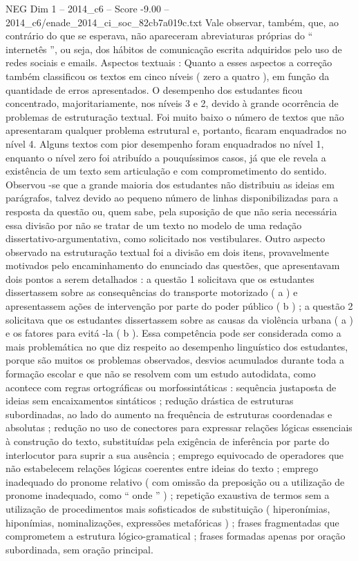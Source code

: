 \begin{textsample}{NEG Dim 1 – 2014\_c6 – Score -9.00 – 2014\_c6/enade\_2014\_ci\_soc\_82cb7a019c.txt}
Vale observar, também, que, ao contrário do que se esperava, não apareceram abreviaturas próprias do “ internetês ”, ou seja, dos hábitos de comunicação escrita adquiridos pelo uso de redes sociais e emails.
Aspectos textuais : Quanto a esses aspectos a correção também classificou os textos em cinco níveis ( zero a quatro ), em função da quantidade de erros apresentados.
O desempenho dos estudantes ficou concentrado, majoritariamente, nos níveis 3 e 2, devido à grande ocorrência de problemas de estruturação textual.
Foi muito baixo o número de textos que não apresentaram qualquer problema estrutural e, portanto, ficaram enquadrados no nível 4.
Alguns textos com pior desempenho foram enquadrados no nível 1, enquanto o nível zero foi atribuído a pouquíssimos casos, já que ele revela a existência de um texto sem articulação e com comprometimento do sentido.
Observou -se que a grande maioria dos estudantes não distribuiu as ideias em parágrafos, talvez devido ao pequeno número de linhas disponibilizadas para a resposta da questão ou, quem sabe, pela suposição de que não seria necessária essa divisão por não se tratar de um texto no modelo de uma redação dissertativo-argumentativa, como solicitado nos vestibulares.
Outro aspecto observado na estruturação textual foi a divisão em dois itens, provavelmente motivados pelo encaminhamento do enunciado das questões, que apresentavam dois pontos a serem detalhados : a questão 1 solicitava que os estudantes dissertassem sobre as consequências do transporte motorizado ( a ) e apresentassem ações de intervenção por parte do poder público ( b ) ; a questão 2 solicitava que os estudantes dissertassem sobre as causas da violência urbana ( a ) e os fatores para evitá -la ( b ).
Essa competência pode ser considerada como a mais problemática no que diz respeito ao desempenho linguístico dos estudantes, porque são muitos os problemas observados, desvios acumulados durante toda a formação escolar e que não se resolvem com um estudo autodidata, como acontece com regras ortográficas ou morfossintáticas : sequência justaposta de ideias sem encaixamentos sintáticos ; redução drástica de estruturas subordinadas, ao lado do aumento na frequência de estruturas coordenadas e absolutas ; redução no uso de conectores para expressar relações lógicas essenciais à construção do texto, substituídas pela exigência de inferência por parte do interlocutor para suprir a sua ausência ; emprego equivocado de operadores que não estabelecem relações lógicas coerentes entre ideias do texto ; emprego inadequado do pronome relativo ( com omissão da preposição ou a utilização de pronome inadequado, como “ onde ” ) ; repetição exaustiva de termos sem a utilização de procedimentos mais sofisticados de substituição ( hiperonímias, hiponímias, nominalizações, expressões metafóricas ) ; frases fragmentadas que comprometem a estrutura lógico-gramatical ; frases formadas apenas por oração subordinada, sem oração principal.

\end{textsample}
